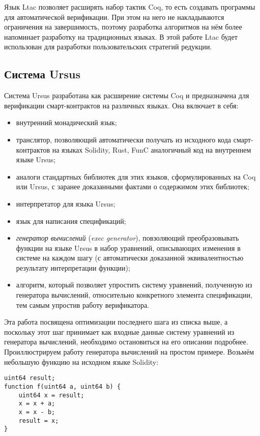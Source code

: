 \documentclass[../diploma.tex]{subfiles}
\begin{document}
Язык Ltac позволяет расширять набор тактик Coq, то есть создавать программы для автоматической верификации. При этом на него не накладываются ограничения на завершимость, поэтому разработка алгоритмов на нём более напоминает разработку на традиционных языках. В этой работе Ltac будет использован для разработки пользовательских стратегий редукции.

\subsection{Система Ursus}

Система Ursus разработана как расширение системы Coq и предназначена для верификации смарт-контрактов на различных языках. Она включает в себя:
\begin{itemize}
    \item внутренний монадический язык;
    \item транслятор, позволяющий автоматически получать из исходного кода смарт-контрактов на языках Solidity, Rust, FunC аналогичный код на внутреннем языке Ursus;
    \item аналоги стандартных библиотек для этих языков, сформулированных на Coq или Ursus, с заранее доказанными фактами о содержимом этих библиотек;
    \item интерпретатор для языка Ursus;
    \item язык для написания спецификаций;
    \item \textit{генератор вычислений} (\textit{exec generator}), повзоляющий преобразовывать функции на языке Ursus в набор уравнений, описывающих изменения в системе на каждом шагу (с автоматически доказанной эквивалентностью результату интерпретации функции);
    \item алгоритм, который позволяет упростить систему уравнений, полученную из генератора вычислений, относительно конкретного элемента спецификации, тем самым упростив работу верификатора.
\end{itemize}

Эта работа посвящена оптимизации последнего шага из списка выше, а поскольку этот шаг принимает как входные данные систему уравнений из генератора вычислений, необходимо остановиться на его описании подробнее. Проиллюстрируем работу генератора вычислений на простом примере. Возьмём небольшую функцию на исходном языке Solidity:

\begin{verbatim}
uint64 result;
function f(uint64 a, uint64 b) {
    uint64 x = result;
    x = x + a;
    x = x - b;
    result = x;
}
\end{verbatim}
\end{document}
